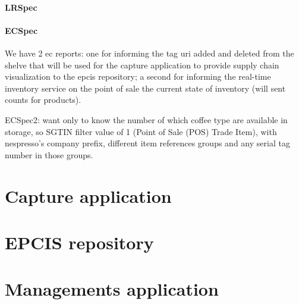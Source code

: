 \paragraph{LRSpec}

\paragraph{ECSpec}

We have 2 ec reports: one for informing the tag uri added and deleted from the shelve that will be used for the capture application to provide supply chain visualization to the epcis repository; a second for informing the real-time inventory service on the point of sale the current state of inventory (will sent counts for products).

ECSpec2: want only to know the number of which coffee type are available in storage, so SGTIN filter value of 1 (Point of Sale (POS) Trade Item), with nespresso's company prefix, different item references groups and any serial tag number in those groups.


\section{Capture application}

\section{EPCIS repository}

\section{Managements application}